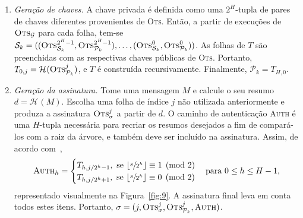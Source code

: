 \documentclass[12pt,notitlepage]{report}
\newcommand{\pk}{\mathcal{P}_k}
\newcommand{\sk}{\mathcal{S}_k}
\newcommand{\hash}[2][]{\mathcal{H}^{#1}(#2)}
\begin{document}
\begin{enumerate}

  \item[] \emph{Geração de chaves.} A chave privada é definida como uma
      $2^{H}$-tupla de pares de chaves diferentes provenientes de \textsc{Ots}.
        Então, a partir de execuções de $\textsc{Ots}_\mathcal{G}$ para cada
        folha, tem-se $\sk{} = ((\textsc{Ots}_{\sk{}}^{2^{H} - 1},
        \textsc{Ots}_{\pk{}}^{2^{H} - 1}), \dots, (\textsc{Ots}_{\sk{}}^{0},
        \textsc{Ots}_{\pk{}}^{0}))$. As folhas de $T$ são preenchidas com as
        respectivas chaves públicas de \textsc{Ots}. Portanto, $T_{0, j} =
        \hash{\textsc{Ots}_{\pk{}}^{j}}$, e $T$ é construída recursivamente.
        Finalmente, $\pk{} = T_{H,0}$.

  \item[] \emph{Geração da assinatura.} Tome uma mensagem $M$ e calcule o seu
      resumo $d = \hash{M}$. Escolha uma folha de índice $j$ não utilizada
        anteriormente e produza a assinatura $\textsc{Ots}_\sigma^{j}$ a
        partir de $d$. O caminho de autenticação \textsc{Auth} é
        uma $H$-tupla necessária para recriar os resumos desejados a fim de
        compará-los com a raiz da árvore, e também deve ser incluído na
        assinatura. Assim, de acordo com~\cite{Bernstein:2008:PQC:1522375},
        \begin{equation}
            \textsc{Auth}_h =
            \begin{cases}
                T_{h, j / 2^h  - 1}, \text{ se } \lfloor \sfrac{s}{2^h} \rfloor \equiv 1 \pmod{2} \\
                T_{h, j / 2^h  + 1}, \text{ se } \lfloor \sfrac{s}{2^h} \rfloor \equiv 0 \pmod{2}
            \end{cases} \text{para } 0 \leq h \leq H - 1,
        \end{equation}
        representado visualmente na Figura~\ref{fig:9}. A assinatura
        final leva em conta todos estes itens. Portanto, $\sigma = (j,
        \textsc{Ots}_\sigma^{j}, \textsc{Ots}_{\pk{}}^{j}, \textsc{Auth})$.


\end{enumerate}
\end{document}
